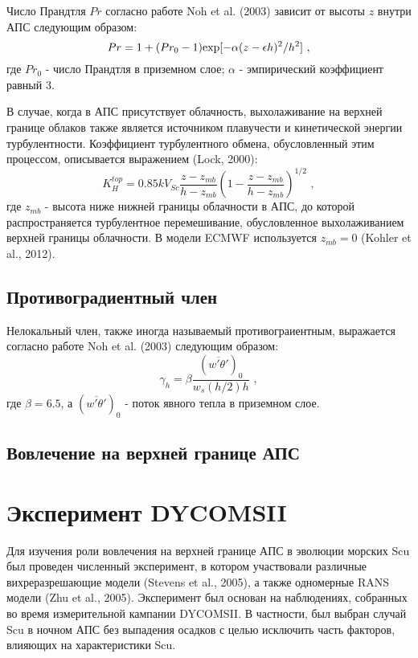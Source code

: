 \documentclass[12pt]{article}
\begin{document}
Число Прандтля $Pr$ согласно работе Noh et al. (2003) зависит от высоты $z$ внутри АПС следующим образом:
%
\begin{equation}
Pr = 1 + (Pr_0 - 1) {\rm exp}[-\alpha (z - \epsilon h)^2 / h^2] \,\, ,
\end{equation}
%
где $Pr_0$ - число Прандтля в приземном слое; $\alpha$ - эмпирический коэффициент равный $3$.

В случае, когда в АПС присутствует облачность, выхолаживание на верхней границе облаков также является источником плавучести и кинетической энергии турбулентности. Коэффициент турбулентного обмена, обусловленный этим процессом, описывается выражением (Lock, 2000):
%
\begin{equation}
K_{H}^{top} = 0.85kV_{Sc}\frac{z - z_{mb}}{h - z_{mb}}\left ( 1 - \frac{z - z_{mb}}{h - z_{mb}}\right )^{1/2} \,\, ,
\end{equation}
%
где $z_{mb}$ - высота ниже нижней границы облачности в АПС, до которой распространяется турбулентное перемешивание, обусловленное выхолаживанием верхней границы облачности. В модели ECMWF используется $z_{mb} = 0$ (Kohler et al., 2012).

\subsection{Противоградиентный член}

Нелокальный член, также иногда называемый противограиентным, выражается согласно работе Noh et al. (2003) следующим образом:
%
\begin{equation}
\gamma_h = \beta\frac{(\overline{w'\theta'})_0}{w_s(h/2)h} \,\, ,
\end{equation}
%
где $\beta = 6.5$, а $(\overline{w'\theta'})_0$ - поток явного тепла в приземном слое.

\subsection{Вовлечение на верхней границе АПС}


\section{Эксперимент DYCOMSII}

Для изучения роли вовлечения на верхней границе АПС в эволюции морских Scu был проведен численный эксперимент, в котором участвовали различные вихреразрешающие модели (Stevens et al., 2005), а также одномерные RANS модели (Zhu et al., 2005). Эксперимент был основан на наблюдениях, собранных во время измерительной кампании DYCOMSII. В частности, был выбран случай Scu в ночном АПС без выпадения осадков с целью исключить часть факторов, влияющих на характеристики Scu.
\end{document}
